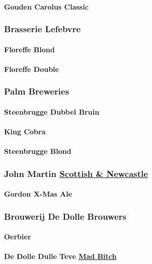 \documentclass[11pt]{article}
\begin{document}
\paragraph{Gouden Carolus Classic}
\label{sec:orgfe04c30}
\subsubsection{Brasserie Lefebvre}
\label{sec:org7a1b2ac}
\paragraph{Floreffe Blond}
\label{sec:org10b19fd}
\paragraph{Floreffe Double}
\label{sec:orgdb07d22}
\subsubsection{Palm Breweries}
\label{sec:org41885a2}
\paragraph{Steenbrugge Dubbel Bruin}
\label{sec:org75d5bb3}
\paragraph{King Cobra}
\label{sec:org70895ed}
\paragraph{Steenbrugge Blond}
\label{sec:orgc7f67ab}
\subsubsection{John Martin \underline{Scottish \& Newcastle}}
\label{sec:orge19c543}
\paragraph{Gordon X-Mas Ale}
\label{sec:orgbc6c1d9}
\subsubsection{Brouwerij De Dolle Brouwers}
\label{sec:orgea8a185}
\paragraph{Oerbier}
\label{sec:orge7a65e2}
\paragraph{De Dolle Dulle Teve \underline{Mad Bitch}}
\label{sec:org4dfa1af}
\end{document}
